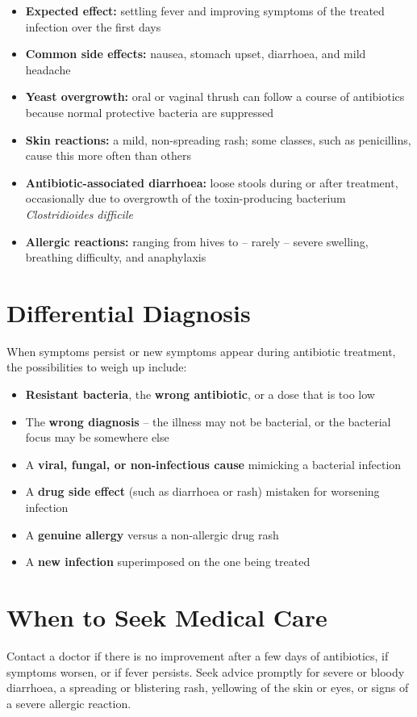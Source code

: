 \begin{itemize}
    \item \textbf{Expected effect:} settling fever and improving symptoms of the treated infection over the first days
    \item \textbf{Common side effects:} nausea, stomach upset, diarrhoea, and mild headache
    \item \textbf{Yeast overgrowth:} oral or vaginal thrush can follow a course of antibiotics because normal protective bacteria are suppressed
    \item \textbf{Skin reactions:} a mild, non-spreading rash; some classes, such as penicillins, cause this more often than others
    \item \textbf{Antibiotic-associated diarrhoea:} loose stools during or after treatment, occasionally due to overgrowth of the toxin-producing bacterium \textit{Clostridioides difficile}
    \item \textbf{Allergic reactions:} ranging from hives to -- rarely -- severe swelling, breathing difficulty, and anaphylaxis
\end{itemize}

\section*{Differential Diagnosis}
When symptoms persist or new symptoms appear during antibiotic treatment, the possibilities to weigh up include:

\begin{itemize}
    \item \textbf{Resistant bacteria}, the \textbf{wrong antibiotic}, or a dose that is too low
    \item The \textbf{wrong diagnosis} -- the illness may not be bacterial, or the bacterial focus may be somewhere else
    \item A \textbf{viral, fungal, or non-infectious cause} mimicking a bacterial infection
    \item A \textbf{drug side effect} (such as diarrhoea or rash) mistaken for worsening infection
    \item A \textbf{genuine allergy} versus a non-allergic drug rash
    \item A \textbf{new infection} superimposed on the one being treated
\end{itemize}

\section*{When to Seek Medical Care}
Contact a doctor if there is no improvement after a few days of antibiotics, if symptoms worsen, or if fever persists. Seek advice promptly for severe or bloody diarrhoea, a spreading or blistering rash, yellowing of the skin or eyes, or signs of a severe allergic reaction.

